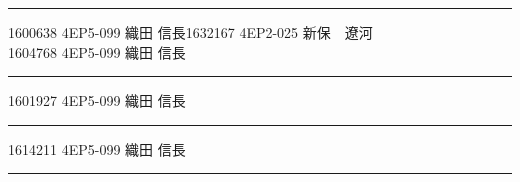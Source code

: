 \documentclass[a4paper,twocolumn]{ltjsarticle}
\begin{document}
\hrule\par\vspace{1mm}
\hspace{1cm}1600638	4EP5-099 織田 信長\hspace{1cm}1632167	4EP2-025 新保　遼河\\ %
\hspace{1cm}1604768	4EP5-099 織田 信長\vspace{1mm}
\hrule\par\vspace{1mm}
\hspace{1cm}1601927	4EP5-099 織田 信長\vspace{1mm} %
\vspace{0.6cm}
\hrule\par\vspace{1mm}
\hspace{1cm}1614211	4EP5-099 織田 信長\vspace{1mm} %
\vspace{0.6cm}\hrule
\end{document}
